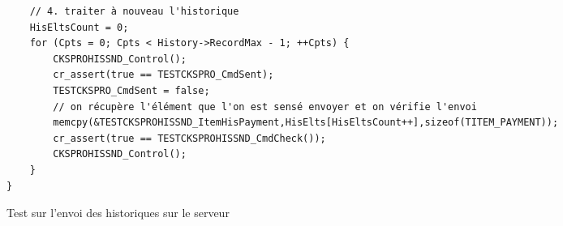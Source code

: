 \documentclass[a4paper]{article}
\begin{document}
\begin{listing}[ht!]
\begin{verbatim}
    // 4. traiter à nouveau l'historique
    HisEltsCount = 0;
    for (Cpts = 0; Cpts < History->RecordMax - 1; ++Cpts) {
        CKSPROHISSND_Control();
        cr_assert(true == TESTCKSPRO_CmdSent);
        TESTCKSPRO_CmdSent = false;
        // on récupère l'élément que l'on est sensé envoyer et on vérifie l'envoi
        memcpy(&TESTCKSPROHISSND_ItemHisPayment,HisElts[HisEltsCount++],sizeof(TITEM_PAYMENT));
        cr_assert(true == TESTCKSPROHISSND_CmdCheck());
        CKSPROHISSND_Control();
    }
}
\end{verbatim}
\caption{Test sur l'envoi des historiques sur le serveur}
\label{testsaveckwash}
\end{listing}
\end{document}
